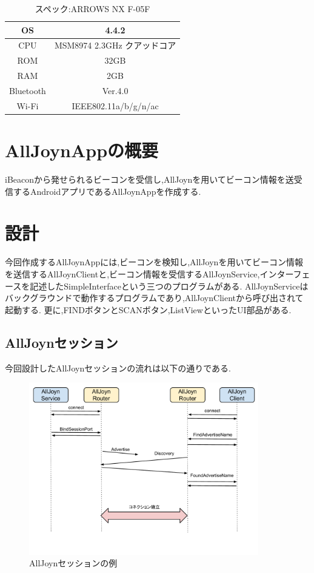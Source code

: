 \begin{table}[htbp]
\centering
\begin{tabular}{|c|c|} \hline
OS &  4.4.2 \\ \hline
CPU & MSM8974 2.3GHz クアッドコア \\ \hline
ROM & 32GB \\ \hline
RAM & 2GB \\ \hline
Bluetooth & Ver.4.0 \\ \hline
Wi-Fi & IEEE802.11a/b/g/n/ac \\ \hline
\end{tabular}
\caption{スペック:ARROWS NX F-05F}
\end{table}


\section{AllJoynAppの概要}
iBeaconから発せられるビーコンを受信し,AllJoynを用いてビーコン情報を送受信するAndroidアプリであるAllJoynAppを作成する.


\section{設計}
今回作成するAllJoynAppには,ビーコンを検知し,AllJoynを用いてビーコン情報を送信するAllJoynClientと,ビーコン情報を受信するAllJoynService,インターフェースを記述したSimpleInterfaceという三つのプログラムがある.
AllJoynServiceはバックグラウンドで動作するプログラムであり,AllJoynClientから呼び出されて起動する.
更に,FINDボタンとSCANボタン,ListViewといったUI部品がある.


\subsection{AllJoynセッション}
今回設計したAllJoynセッションの流れは以下の通りである.

\begin{figure}[htbp]
\centering
\includegraphics[width=10cm]{fig/AllJoyn_Session.pdf}
\caption{AllJoynセッションの例}
\end{figure}

